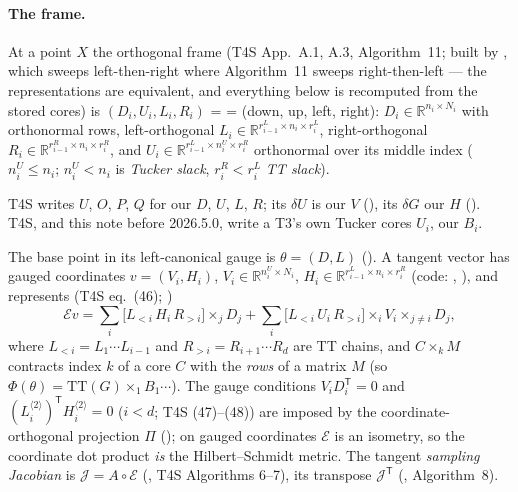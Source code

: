 \documentclass[11pt]{article}
\newcommand{\R}{\mathbb{R}}
\newcommand{\Emap}{\mathcal{E}}
\newcommand{\Jac}{\mathcal{J}}
\newcommand{\T}{\mathsf{T}}
\renewcommand{\th}{\theta}
\theoremstyle{definition}
\theoremstyle{plain}
\begin{document}
\paragraph{The frame.} At a point $X$ the orthogonal frame (T4S \cite{T4S} App.~A.1, A.3, Algorithm~11; built by
, which sweeps left-then-right where Algorithm~11 sweeps right-then-left ---
the representations are equivalent, and everything below is recomputed from the stored cores) is $(D_i, U_i, L_i, R_i)$ =  = (down, up, left, right):
$D_i\in\R^{n_i\times N_i}$ with orthonormal rows, left-orthogonal $L_i\in\R^{r^L_{i-1}\times n_i\times r^L_i}$,
right-orthogonal $R_i\in\R^{r^R_{i-1}\times n_i\times r^R_i}$, and $U_i\in\R^{r^L_{i-1}\times n^U_i\times r^R_i}$
orthonormal over its middle index ($n^U_i\le n_i$; $n^U_i<n_i$ is \emph{Tucker slack}, $r^R_i<r^L_i$ \emph{TT slack}).

T4S writes $U$, $O$, $P$, $Q$ for our $D$, $U$, $L$, $R$; its $\delta U$ is our $V$ (), its $\delta G$ our $H$ ().
T4S, and this note before 2026.5.0, write a T3's own Tucker cores $U_i$, our $B_i$.

The base point in its left-canonical gauge is $\th=(D,L)$ ().
A tangent vector has gauged coordinates $v=(V_i,H_i)$, $V_i\in\R^{n^U_i\times N_i}$,
$H_i\in\R^{r^L_{i-1}\times n_i\times r^R_i}$ (code: , ),
and represents (T4S eq.~(46); )
\begin{equation}
  \label{eq:E}
  \Emap v = \sum_i \big[L_{<i}\,H_i\,R_{>i}\big]\times_j D_j
          + \sum_i \big[L_{<i}\,U_i\,R_{>i}\big]\times_i V_i \times_{j\neq i} D_j ,
\end{equation}
where $L_{<i}=L_1\cdots L_{i-1}$ and $R_{>i}=R_{i+1}\cdots R_d$ are TT chains, and $C\times_kM$ contracts
index $k$ of a core $C$ with the \emph{rows} of a matrix $M$ (so $\Phi(\th)=\mathrm{TT}(G)\times_1B_1\cdots$). The gauge conditions
$V_i D_i^\T=0$ and $(L_i^{\langle 2\rangle})^\T H_i^{\langle 2\rangle}=0$ ($i<d$; T4S (47)--(48)) are
imposed by the coordinate-orthogonal projection $\Pi$ (); on gauged
coordinates $\Emap$ is an isometry, so the coordinate dot product \emph{is} the Hilbert--Schmidt metric. The
tangent \emph{sampling Jacobian} is $\Jac = A\circ\Emap$ (, T4S Algorithms 6--7), its
transpose $\Jac^\T$ (, Algorithm~8).
\end{document}
